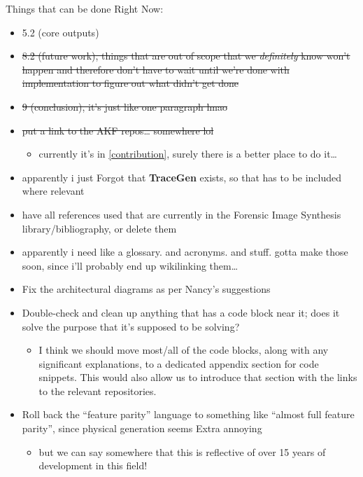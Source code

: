 Things that can be done Right Now:

\begin{itemize}
\tightlist
\item
  5.2 (core outputs)
\item
  \st{8.2 (future work), things that are out of scope that we
  \emph{definitely} know won't happen and therefore don't have to wait
  until we're done with implementation to figure out what didn't get
  done}
\item
  \st{9 (conclusion), it's just like one paragraph lmao}
\item
  \st{put a link to the AKF repos\ldots{} somewhere lol}

  \begin{itemize}
  \tightlist
  \item
    currently it's in \autoref{contribution},
    surely there is a better place to do it\ldots{}
  \end{itemize}
\item
  apparently i just Forgot that \textbf{TraceGen} exists, so that has to
  be included where relevant
\item
  have all references used that are currently in the Forensic Image
  Synthesis library/bibliography, or delete them
\item
  apparently i need like a glossary. and acronyms. and stuff. gotta make
  those soon, since i'll probably end up wikilinking them\ldots{}
\item
  Fix the architectural diagrams as per Nancy's suggestions
\item
  Double-check and clean up anything that has a code block near it; does
  it solve the purpose that it's supposed to be solving?

  \begin{itemize}
  \tightlist
  \item
    I think we should move most/all of the code blocks, along with any
    significant explanations, to a dedicated appendix section for code
    snippets. This would also allow us to introduce that section with
    the links to the relevant repositories.
  \end{itemize}
\item
  Roll back the ``feature parity'' language to something like ``almost
  full feature parity'', since physical generation seems Extra annoying

  \begin{itemize}
  \tightlist
  \item
    but we can say somewhere that this is reflective of over 15 years of
    development in this field!
  \end{itemize}
\end{itemize}

